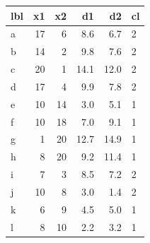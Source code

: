 \documentclass[a4paper]{article}
\begin{document}
\begin{minipage}[t]{0.49\textwidth}
\begin{Schunk}

\begin{tabular}{lrr>{}r>{}r>{}l}
\toprule
lbl & x1 & x2 & d1 & d2 & cl\\
\midrule
a & 17 & 6 & \textcolor{myblue}{8.6} & \textcolor{myblue}{6.7} & \textcolor{myblue}{2}\\
b & 14 & 2 & \textcolor{myblue}{9.8} & \textcolor{myblue}{7.6} & \textcolor{myblue}{2}\\
c & 20 & 1 & \textcolor{myblue}{14.1} & \textcolor{myblue}{12.0} & \textcolor{myblue}{2}\\
d & 17 & 4 & \textcolor{myblue}{9.9} & \textcolor{myblue}{7.8} & \textcolor{myblue}{2}\\
e & 10 & 14 & \textcolor{myblue}{3.0} & \textcolor{myblue}{5.1} & \textcolor{myblue}{1}\\
\addlinespace
f & 10 & 18 & \textcolor{myblue}{7.0} & \textcolor{myblue}{9.1} & \textcolor{myblue}{1}\\
g & 1 & 20 & \textcolor{myblue}{12.7} & \textcolor{myblue}{14.9} & \textcolor{myblue}{1}\\
h & 8 & 20 & \textcolor{myblue}{9.2} & \textcolor{myblue}{11.4} & \textcolor{myblue}{1}\\
i & 7 & 3 & \textcolor{myblue}{8.5} & \textcolor{myblue}{7.2} & \textcolor{myblue}{2}\\
j & 10 & 8 & \textcolor{myblue}{3.0} & \textcolor{myblue}{1.4} & \textcolor{myblue}{2}\\
\addlinespace
k & 6 & 9 & \textcolor{myblue}{4.5} & \textcolor{myblue}{5.0} & \textcolor{myblue}{1}\\
l & 8 & 10 & \textcolor{myblue}{2.2} & \textcolor{myblue}{3.2} & \textcolor{myblue}{1}\\
\bottomrule
\end{tabular}

\end{Schunk}
\end{minipage}
\hspace{0.02\textwidth}
\end{document}
